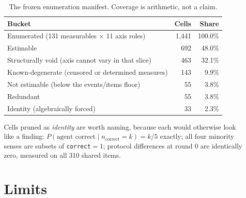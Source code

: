 \documentclass[11pt]{article}
\begin{document}
\begin{table}[H]\centering\small
\caption{The frozen enumeration manifest. Coverage is arithmetic, not a claim.}
\begin{tabular}{lrr}
\toprule
\textbf{Bucket} & \textbf{Cells} & \textbf{Share} \\
\midrule
Enumerated (131 measurables $\times$ 11 axis roles) & 1{,}441 & 100.0\% \\
\midrule
Estimable & 692 & 48.0\% \\
Structurally void (axis cannot vary in that slice) & 463 & 32.1\% \\
Known-degenerate (censored or determined measures) & 143 & 9.9\% \\
Not estimable (below the events/items floor) & 55 & 3.8\% \\
Redundant & 55 & 3.8\% \\
Identity (algebraically forced) & 33 & 2.3\% \\
\bottomrule
\end{tabular}
\end{table}

Cells pruned as \emph{identity} are worth naming, because each would otherwise look like a finding:
$P(\text{agent correct} \mid n_{\text{correct}}{=}k) = k/5$ exactly; all four minority senses are
subsets of \texttt{correct}${=}1$; protocol differences at round 0 are identically zero, measured
on all 310 shared items.

\section{Limits}
\end{document}
